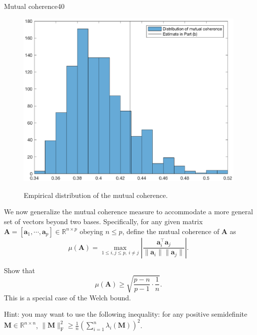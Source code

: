 \documentclass{article}
\begin{document}
\begin{problem}{Mutual coherence}{40}
{\begin{figure}[ht]
\centering
  \includegraphics[width=0.6\columnwidth]{./figures/histo.eps}\\
  \caption{Empirical distribution of the mutual coherence.}
  \label{fig:emp}
\end{figure}

}


We now generalize the mutual coherence measure to accommodate a more general set of vectors beyond two bases. Specifically, for any given matrix $\bm{A} = [\bm{a}_1, \cdots, \bm{a}_p] \in \mathbb{R}^{n\times p}$ obeying $n \leq  p$, define the mutual coherence of $\bm{A}$ as
\[
  \mu(\bm{A} ) = \max_{1\leq i,j\leq p, ~i\neq j} \left| \frac{\bm{a}_i^{\top} \bm{a}_j}{ \| \bm{a}_i \| \| \bm{a}_j \|  }  \right|.
\]

Show that
\[
  \mu(\bm{A})\geq\sqrt{\frac{p-n}{p-1}\cdot\frac{1}{n}}.
\]
This is a special case of the Welch bound.

\vspace{0.5em}
Hint: you may want to use the following inequality: for any positive semidefinite $\bm{M}\in \mathbb{R}^{n\times n}$,  $\| \bm{M} \|_{\mathrm{F}}^2 \geq \frac{1}{n} \left( \sum_{i=1}^n \lambda_i(\bm{M}) \right)^2$. 

\end{problem}
\end{document}
